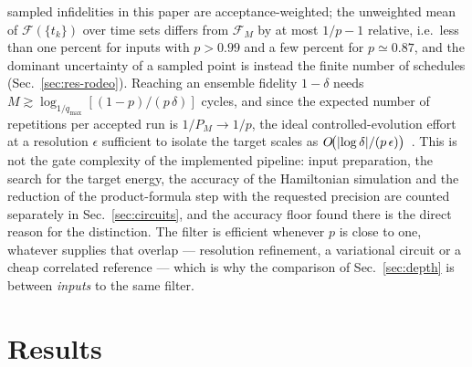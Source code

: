 \documentclass[
  aps,            %
  prc,            %
  reprint,        %
  superscriptaddress,
  floatfix,
  nofootinbib
]{revtex4-2}
\begin{document}
sampled infidelities in this paper are acceptance-weighted; the unweighted
mean of $\mathcal F(\{t_k\})$ over time sets differs from $\mathcal F_M$ by at
most $1/p-1$ relative, i.e.\ less than one percent for inputs with $p>0.99$ and
a few percent for $p\simeq0.87$, and the dominant uncertainty of a sampled
point is instead the finite number of schedules (Sec.~\ref{sec:res-rodeo}).  Reaching an ensemble fidelity $1-\delta$ needs
$M\gtrsim\log_{1/q_{\max}}[(1-p)/(p\,\delta)]$ cycles, and since the expected
number of repetitions per accepted run is $1/P_M\to1/p$, the ideal
controlled-evolution effort at a resolution $\epsilon$ sufficient to isolate
the target scales as $O\!\big(\abs{\log\delta}/(p\,\epsilon)\big)$~\cite{Choi2021}.
This is not the gate complexity of the implemented pipeline: input
preparation, the search for the target energy, the accuracy of the
Hamiltonian simulation and the reduction of the product-formula step with the
requested precision are counted separately in Sec.~\ref{sec:circuits}, and
the accuracy floor found there is the direct reason for the distinction.  The filter is efficient
whenever $p$ is close to one, whatever supplies that overlap --- resolution
refinement, a variational circuit or a cheap correlated reference --- which is
why the comparison of Sec.~\ref{sec:depth} is between \emph{inputs} to the
same filter.

\section{Results}
\end{document}
